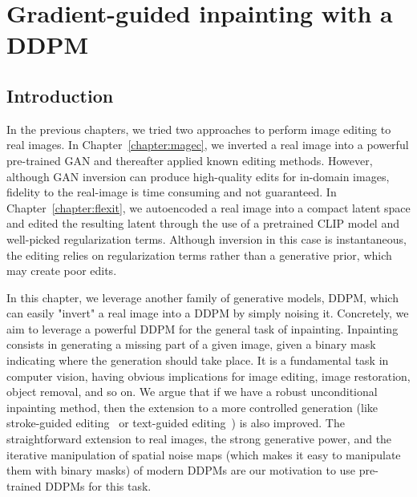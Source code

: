 \chapter{Gradient-guided inpainting with a DDPM}
\label{chapter:gradpaint}

 


\section{Introduction}

In the previous chapters, we tried two approaches to perform image editing to real images. In 
Chapter~\ref{chapter:magec}, we inverted a real image into a powerful pre-trained \ac{GAN} 
and thereafter applied known editing methods. However, although \ac{GAN} inversion can produce 
high-quality edits for in-domain images, fidelity to the real-image is time consuming and not guaranteed. 
In Chapter~\ref{chapter:flexit}, we  autoencoded a real image into a compact latent space and edited the resulting latent through 
the use of a pretrained \ac{CLIP} model and well-picked regularization terms. Although inversion in this case
is instantaneous, the editing relies on regularization terms rather than a generative prior, which may create poor edits.

In this chapter, we leverage another family of generative models, \ac{DDPM}, which can easily "invert" a real image 
into a \ac{DDPM} by simply noising it. Concretely, we aim to leverage a powerful \ac{DDPM} for the general 
task of inpainting. 
Inpainting consists in generating a missing part of a given image, given a binary mask 
indicating where the generation should take place. It is a fundamental task in computer
 vision, having obvious implications for image editing, image restoration, object 
 removal, and so on. We argue that if we have a robust unconditional 
inpainting method, then the extension to a more controlled generation (like stroke-guided editing~\citep{meng2022sdedit} or 
text-guided editing~\citep{nichol2021glide}) is also improved. The straightforward extension to real images, the strong generative power, 
and the iterative manipulation of spatial noise maps (which makes it easy to manipulate them with binary masks)  
of modern \ac{DDPM}s are our motivation to use pre-trained 
\ac{DDPM}s for this task. 


